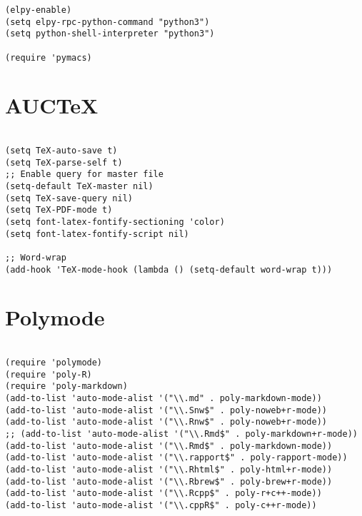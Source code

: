 \documentclass[11pt]{article}
\begin{document}
\begin{verbatim}
(elpy-enable)				
(setq elpy-rpc-python-command "python3")
(setq python-shell-interpreter "python3")

(require 'pymacs)

\end{verbatim}

\section*{AUCTeX}
\label{sec:org9884e1d}
\begin{verbatim}

(setq TeX-auto-save t)			    
(setq TeX-parse-self t)
;; Enable query for master file
(setq-default TeX-master nil)		    
(setq TeX-save-query nil)		    
(setq TeX-PDF-mode t)			    
(setq font-latex-fontify-sectioning 'color) 
(setq font-latex-fontify-script nil)	    

;; Word-wrap
(add-hook 'TeX-mode-hook (lambda () (setq-default word-wrap t)))

\end{verbatim}

\section*{Polymode}
\label{sec:orge3330f6}

\begin{verbatim}

(require 'polymode)
(require 'poly-R)
(require 'poly-markdown)
(add-to-list 'auto-mode-alist '("\\.md" . poly-markdown-mode))
(add-to-list 'auto-mode-alist '("\\.Snw$" . poly-noweb+r-mode))
(add-to-list 'auto-mode-alist '("\\.Rnw$" . poly-noweb+r-mode))
;; (add-to-list 'auto-mode-alist '("\\.Rmd$" . poly-markdown+r-mode))
(add-to-list 'auto-mode-alist '("\\.Rmd$" . poly-markdown-mode))
(add-to-list 'auto-mode-alist '("\\.rapport$" . poly-rapport-mode))
(add-to-list 'auto-mode-alist '("\\.Rhtml$" . poly-html+r-mode))
(add-to-list 'auto-mode-alist '("\\.Rbrew$" . poly-brew+r-mode))
(add-to-list 'auto-mode-alist '("\\.Rcpp$" . poly-r+c++-mode))
(add-to-list 'auto-mode-alist '("\\.cppR$" . poly-c++r-mode))
\end{verbatim}
\end{document}
